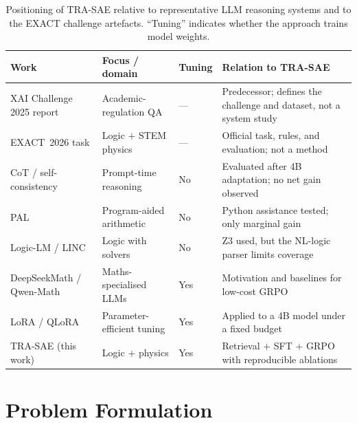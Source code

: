 \documentclass[APA,twocolumn]{USG}
\newcommand{\modelname}{TRA-SAE}
\newcommand{\dataset}{EXACT~2026}
\begin{document}
\begin{table}[t]
\centering
\caption{Positioning of \modelname{} relative to representative LLM reasoning
systems and to the EXACT challenge artefacts. ``Tuning'' indicates whether the
approach trains model weights.\label{tabrelated}}
\begin{tabular*}{\textwidth}{@{\extracolsep\fill}p{}p{}p{}p{}@{}}
\toprule
\textbf{Work} & \textbf{Focus / domain} & \textbf{Tuning} & \textbf{Relation to \modelname{}} \\
\midrule
XAI Challenge 2025 report \citep{Nguyen2025XAIChallenge} & Academic-regulation QA & --- & Predecessor; defines the challenge and dataset, not a system study \\
\dataset{} task \citep{EXACT2026} & Logic $+$ STEM physics & --- & Official task, rules, and evaluation; not a method \\
CoT / self-consistency \citep{Wei2022,Wang2023sc} & Prompt-time reasoning & No & Evaluated after 4B adaptation; no net gain observed \\
PAL \citep{Gao2022} & Program-aided arithmetic & No & Python assistance tested; only marginal gain \\
Logic-LM / LINC \citep{Pan2023,Olausson2023} & Logic with solvers & No & Z3 used, but the NL-logic parser limits coverage \\
DeepSeekMath / Qwen-Math \citep{Shao2024,Yang2024} & Maths-specialised LLMs & Yes & Motivation and baselines for low-cost GRPO \\
LoRA / QLoRA \citep{Hu2022,Dettmers2023} & Parameter-efficient tuning & Yes & Applied to a 4B model under a fixed budget \\
\modelname{} (this work) & Logic $+$ physics & Yes & Retrieval $+$ SFT $+$ GRPO with reproducible ablations \\
\bottomrule
\end{tabular*}
\end{table}

\section{Problem Formulation}\label{sec3}
\end{document}
